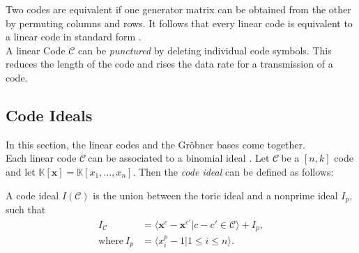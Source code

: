 Two codes are equivalent if one generator matrix can be obtained from the other by permuting columns and rows.
It follows that every linear code is equivalent to a linear code in standard form \cite{dueckjournal}. \\

A linear Code $\mathcal{C}$ can be \textit{punctured} by deleting individual code symbols.
This reduces the length of the code and rises the data rate for a transmission of a code.


\subsection{Code Ideals}
\label{subsec:codeideals}
In this section, the linear codes and the Gröbner bases come together.\\
Each linear code $\mathcal{C}~$can be associated to a binomial ideal \cite{dueckpaper}. Let $\mathcal{C}~$be a $[n,k]$ code and let 
$\mathbb{K}[\textbf{x}]=\mathbb{K}[x_{1},\dots,x_{n}]$.
Then the \textit{code ideal} can be defined as follows:

\begin{env_definition}
\cite{dueckpaper} A code ideal $I(\mathcal{C})$ is the union between the toric ideal and a nonprime ideal $I_{p}$, such that
\begin{align*}
 I_{\mathcal{C}} & = \langle \textbf{x}^{c} - \textbf{x}^{c'} | c - c' \in \mathcal{C}  \rangle + I_{p},\\
\textrm{where} ~ I_{p} & = \langle x_{i}^{p} - 1 | 1 \leq i \leq n \rangle .
\end{align*}
\end{env_definition}

\newpage

